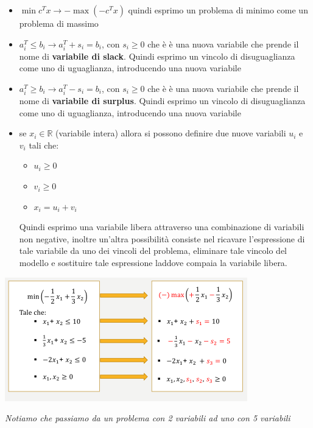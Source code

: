 \message{ !name(ro.tex)}\documentclass[a4paper,12pt, oneside]{book}
\begin{document}
\begin{itemize}
  \item $\min c^Tx \to -\max (-c^Tx)$ quindi esprimo un problema di
  minimo come un problema di massimo
  \item $a_i^T\leq b_i \to a_i^T+s_i=b_i$, con $s_i\geq 0$ che è è una
  nuova variabile che prende il nome di \textbf{variabile di
    slack}. Quindi esprimo un vincolo di disuguaglianza come uno di
  uguaglianza, introducendo una nuova variabile
  \item $a_i^T\geq b_i \to a_i^T-s_i=b_i$, con $s_i\geq 0$ che è è una
  nuova variabile che prende il nome di \textbf{variabile di
    surplus}. Quindi esprimo un vincolo di disuguaglianza come uno di
  uguaglianza, introducendo una nuova variabile
  \item se $x_i\in \mathbb{R}$ (variabile intera) allora si possono
  definire due nuove variabili $u_i$ e $v_i$ tali che:
  \begin{itemize}
    \item $u_i\geq 0$
    \item $v_i\geq 0$
    \item $x_i=u_i+v_i$
  \end{itemize}
  Quindi esprimo una variabile libera attraverso una combinazione
  di variabili non negative, inoltre un'altra possibilità consiste nel
  ricavare l’espressione di tale variabile da uno dei vincoli del
  problema, eliminare tale vincolo del modello e sostituire tale
  espressione laddove compaia la variabile libera.
\end{itemize}
\begin{esempio}
  \begin{center}
    \includegraphics[scale = 0.8]{img/sim.png}
  \end{center}
  \textit{Notiamo che passiamo da un problema con 2 variabili ad
    uno con 5 variabili}
\end{esempio}
\end{document}
